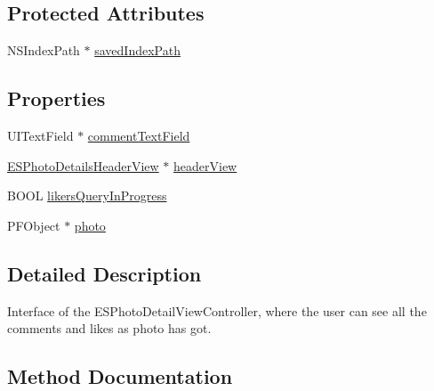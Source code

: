 \subsection*{Protected Attributes}
\begin{DoxyCompactItemize}
\item 
N\+S\+Index\+Path $\ast$ \hyperlink{interface_e_s_photo_details_view_controller_a6aa779cbafb3251d2ce858f412e41cff}{saved\+Index\+Path}
\end{DoxyCompactItemize}
\subsection*{Properties}
\begin{DoxyCompactItemize}
\item 
U\+I\+Text\+Field $\ast$ \hyperlink{interface_e_s_photo_details_view_controller_a8e199c1b36959e0e6a9415801eaf5ab7}{comment\+Text\+Field}
\item 
\hyperlink{interface_e_s_photo_details_header_view}{E\+S\+Photo\+Details\+Header\+View} $\ast$ \hyperlink{interface_e_s_photo_details_view_controller_a2878c7bcebda936f94dd1115845270c8}{header\+View}
\item 
B\+O\+O\+L \hyperlink{interface_e_s_photo_details_view_controller_a9872497a90a81c8e2a95dfb2a939a2de}{likers\+Query\+In\+Progress}
\item 
P\+F\+Object $\ast$ \hyperlink{interface_e_s_photo_details_view_controller_a6d43b7922fdded0e3857d8d6c7216837}{photo}
\end{DoxyCompactItemize}


\subsection{Detailed Description}
Interface of the E\+S\+Photo\+Detail\+View\+Controller, where the user can see all the comments and likes as photo has got. 

\subsection{Method Documentation}
\hypertarget{interface_e_s_photo_details_view_controller_a7ecd71e49e916a526bef700a53518fec}{}
